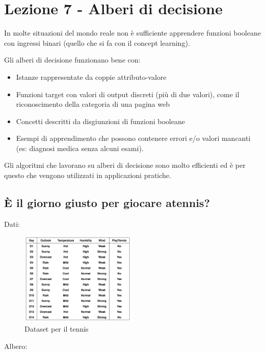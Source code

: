 \section{Lezione 7 - Alberi di decisione}\label{lezione-7---alberi-di-decisione}

In molte situazioni del mondo reale non è sufficiente apprendere
funzioni booleane con ingressi binari (quello che si fa con il concept
learning).

Gli alberi di decisione funzionano bene con:

\begin{itemize}
\item
  Istanze rappresentate da coppie attributo-valore
\item
  Funzioni target con valori di output discreti (più di due valori),
  come il riconoscimento della categoria di una pagina web
\item
  Concetti descritti da disgiunzioni di funzioni booleane
\item
  Esempi di apprendimento che possono contenere errori e/o valori
  mancanti (es: diagnosi medica senza alcuni esami).
\end{itemize}

Gli algoritmi che lavorano su alberi di decisione sono molto efficienti
ed è per questo che vengono utilizzati in applicazioni pratiche.

\subsection{È il giorno giusto per giocare atennis?}\label{uxe8-il-giorno-giusto-per-giocare-a-tennis}

Dati:

\begin{figure}[htbp]
\centering
\includegraphics[width=0.5\textwidth]{./notes/immagini/l7-tabella.png}
\caption{Dataset per il tennis}
\end{figure}
\FloatBarrier
Albero:

